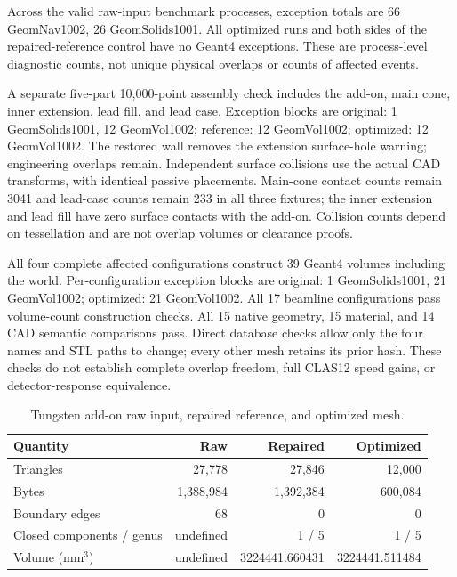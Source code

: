 Across the valid raw-input benchmark processes, exception totals are 66 GeomNav1002, 26 GeomSolids1001. All
optimized runs and both sides of the repaired-reference control have no Geant4 exceptions. These are
process-level diagnostic counts, not unique physical overlaps or counts of affected events.

A separate five-part 10,000-point assembly check includes the add-on, main cone, inner extension, lead fill,
and lead case. Exception blocks are original: 1 GeomSolids1001, 12 GeomVol1002; reference: 12 GeomVol1002;
optimized: 12 GeomVol1002. The restored wall removes the extension surface-hole warning; engineering overlaps
remain. Independent surface collisions use the actual CAD transforms, with identical passive placements.
Main-cone contact counts remain 3041 and lead-case counts remain 233 in all three fixtures; the inner
extension and lead fill have zero surface contacts with the add-on. Collision counts depend on tessellation
and are not overlap volumes or clearance proofs.

All four complete affected configurations construct 39 Geant4 volumes including the world. Per-configuration
exception blocks are original: 1 GeomSolids1001, 21 GeomVol1002; optimized: 21 GeomVol1002. All 17 beamline
configurations pass volume-count construction checks. All 15 native geometry, 15 material, and 14 CAD semantic
comparisons pass. Direct database checks allow only the four names and STL paths to change; every other mesh
retains its prior hash. These checks do not establish complete overlap freedom, full CLAS12 speed gains, or
detector-response equivalence.

\begin{table}[htbp]
\centering
\caption{Tungsten add-on raw input, repaired reference, and optimized mesh.}
\label{tab:extension-tungsten-mesh}
\setlength{\tabcolsep}{5pt}
\begin{tabular}{lrrr}
\toprule
Quantity & Raw & Repaired & Optimized \\
\midrule
Triangles & 27,778 & 27,846 & 12,000 \\
Bytes & 1,388,984 & 1,392,384 & 600,084 \\
Boundary edges & 68 & 0 & 0 \\
Closed components / genus & undefined & 1 / 5 & 1 / 5 \\
Volume (mm$^3$) & undefined & 3224441.660431 & 3224441.511484 \\
\bottomrule
\end{tabular}
\end{table}

